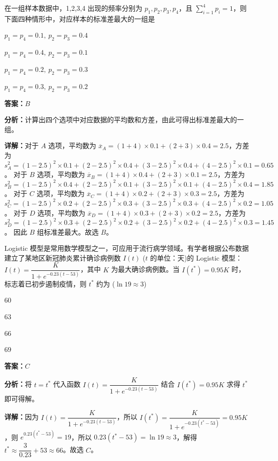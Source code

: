 \begin{question}[points=5]
在一组样本数据中，1,2,3,4 出现的频率分别为 $p_1,p_2,p_3,p_4$，且 $\sum\limits_{i=1}^4 p_i=1$，则下面四种情形中，对应样本的标准差最大的一组是
\begin{choices}
  \item $p_1=p_4=0.1,\ p_2=p_3=0.4$
  \item $p_1=p_4=0.4,\ p_2=p_3=0.1$
  \item $p_1=p_4=0.2,\ p_2=p_3=0.3$
  \item $p_1=p_4=0.3,\ p_2=p_3=0.2$
\end{choices}
\begin{solution}
\textbf{答案：}$B$

\textbf{分析：}计算出四个选项中对应数据的平均数和方差，由此可得出标准差最大的一组。

\textbf{详解：}对于 $A$ 选项，平均数为 $\overline{x}_A=(1+4)\times 0.1+(2+3)\times 0.4=2.5$，方差为 $s_A^2=(1-2.5)^2\times0.1+(2-2.5)^2\times0.4+(3-2.5)^2\times0.4+(4-2.5)^2\times0.1=0.65$。
对于 $B$ 选项，平均数为 $\overline{x}_B=(1+4)\times0.4+(2+3)\times0.1=2.5$，方差为 $s_B^2=(1-2.5)^2\times0.4+(2-2.5)^2\times0.1+(3-2.5)^2\times0.1+(4-2.5)^2\times0.4=1.85$。
对于 $C$ 选项，平均数为 $\overline{x}_C=(1+4)\times0.2+(2+3)\times0.3=2.5$，方差为 $s_C^2=(1-2.5)^2\times0.2+(2-2.5)^2\times0.3+(3-2.5)^2\times0.3+(4-2.5)^2\times0.2=1.05$。
对于 $D$ 选项，平均数为 $\overline{x}_D=(1+4)\times0.3+(2+3)\times0.2=2.5$，方差为 $s_D^2=(1-2.5)^2\times0.3+(2-2.5)^2\times0.2+(3-2.5)^2\times0.2+(4-2.5)^2\times0.3=1.45$。
因此 $B$ 组标准差最大。故选 $B$。
\end{solution}
\end{question}

\begin{question}[points=5]
Logistic 模型是常用数学模型之一，可应用于流行病学领域。有学者根据公布数据建立了某地区新冠肺炎累计确诊病例数 $I(t)$ ($t$ 的单位：天)的 Logistic 模型：$I(t)=\dfrac{K}{1+e^{-0.23(t-53)}}$，其中 $K$ 为最大确诊病例数。当 $I(t^*)=0.95K$ 时，标志着已初步遏制疫情，则 $t^*$ 约为 ($\ln 19\approx 3$)
\begin{choices}
  \item $60$
  \item $63$
  \item $66$
  \item $69$
\end{choices}
\begin{solution}
\textbf{答案：}$C$

\textbf{分析：}将 $t=t^*$ 代入函数 $I(t)=\dfrac{K}{1+e^{-0.23(t-53)}}$ 结合 $I(t^*)=0.95K$ 求得 $t^*$ 即可得解。

\textbf{详解：}因为 $I(t)=\dfrac{K}{1+e^{-0.23(t-53)}}$，所以 $I(t^*)=\dfrac{K}{1+e^{-0.23(t^*-53)}}=0.95K$，则 $e^{0.23(t^*-53)}=19$，所以 $0.23(t^*-53)=\ln 19\approx3$，解得 $t^*\approx\dfrac{3}{0.23}+53\approx66$。故选 $C$。
\end{solution}
\end{question}

